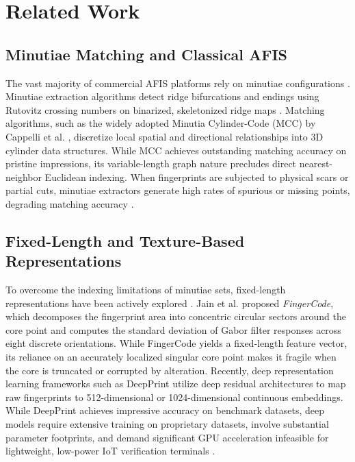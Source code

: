 \documentclass[lettersize,journal]{IEEEtran}
\begin{document}
\section{Related Work}
\label{sec:related_work}

\subsection{Minutiae Matching and Classical AFIS}
The vast majority of commercial AFIS platforms rely on minutiae configurations \cite{b1, b2}. Minutiae extraction algorithms detect ridge bifurcations and endings using Rutovitz crossing numbers on binarized, skeletonized ridge maps \cite{b1, b27}. Matching algorithms, such as the widely adopted Minutia Cylinder-Code (MCC) by Cappelli et al. \cite{b2}, discretize local spatial and directional relationships into 3D cylinder data structures. While MCC achieves outstanding matching accuracy on pristine impressions, its variable-length graph nature precludes direct nearest-neighbor Euclidean indexing. When fingerprints are subjected to physical scars or partial cuts, minutiae extractors generate high rates of spurious or missing points, degrading matching accuracy \cite{b34}.

\subsection{Fixed-Length and Texture-Based Representations}
To overcome the indexing limitations of minutiae sets, fixed-length representations have been actively explored \cite{b3, b28}. Jain et al. \cite{b3} proposed \textit{FingerCode}, which decomposes the fingerprint area into concentric circular sectors around the core point and computes the standard deviation of Gabor filter responses across eight discrete orientations. While FingerCode yields a fixed-length feature vector, its reliance on an accurately localized singular core point makes it fragile when the core is truncated or corrupted by alteration. Recently, deep representation learning frameworks such as DeepPrint \cite{b15} utilize deep residual architectures to map raw fingerprints to 512-dimensional or 1024-dimensional continuous embeddings. While DeepPrint achieves impressive accuracy on benchmark datasets, deep models require extensive training on proprietary datasets, involve substantial parameter footprints, and demand significant GPU acceleration infeasible for lightweight, low-power IoT verification terminals \cite{b15, b33}.
\end{document}
